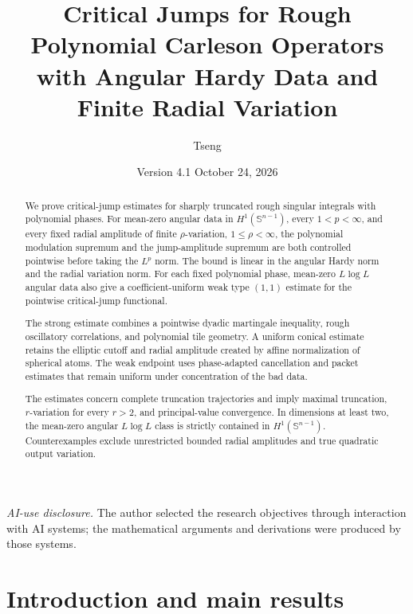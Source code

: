 \documentclass[11pt]{article}
\title{Critical Jumps for Rough Polynomial Carleson Operators\\
       with Angular Hardy Data and Finite Radial Variation}
\author{Tseng}
\date{Version 4.1 \textperiodcentered{} October 24, 2026}
\numberwithin{equation}{section}
\theoremstyle{remark}
\theoremstyle{definition}
\begin{document}
\maketitle
\begin{abstract}
We prove critical-jump estimates for sharply truncated rough singular
integrals with polynomial phases. For mean-zero angular data in
$H^1(\mathbb S^{n-1})$, every $1<p<\infty$, and every fixed radial
amplitude of finite $\rho$-variation, $1\le\rho<\infty$, the polynomial
modulation supremum and the jump-amplitude supremum are both controlled
pointwise before taking the $L^p$ norm. The bound is linear in the
angular Hardy norm and the radial variation norm. For each fixed
polynomial phase, mean-zero $L\log L$ angular data also give a
coefficient-uniform weak type $(1,1)$ estimate for the pointwise
critical-jump functional.

The strong estimate combines a pointwise dyadic martingale inequality,
rough oscillatory correlations, and polynomial tile geometry. A uniform
conical estimate retains the elliptic cutoff and radial amplitude
created by affine normalization of spherical atoms. The weak endpoint
uses phase-adapted cancellation and packet estimates that remain uniform
under concentration of the bad data.

The estimates concern complete truncation trajectories and imply maximal
truncation, $r$-variation for every $r>2$, and principal-value convergence.
In dimensions at least two, the mean-zero angular $L\log L$ class is
strictly contained in $H^1(\mathbb S^{n-1})$. Counterexamples exclude unrestricted
bounded radial amplitudes and true quadratic output variation.
\end{abstract}
\medskip\noindent\textit{AI-use disclosure.}
The author selected the research objectives through interaction with AI systems;
the mathematical arguments and derivations were produced by those systems.
\medskip

\clearpage
\begingroup
\small
{}
\tableofcontents
\endgroup
\clearpage

\section{Introduction and main results}\label{sec:introduction}
\end{document}
